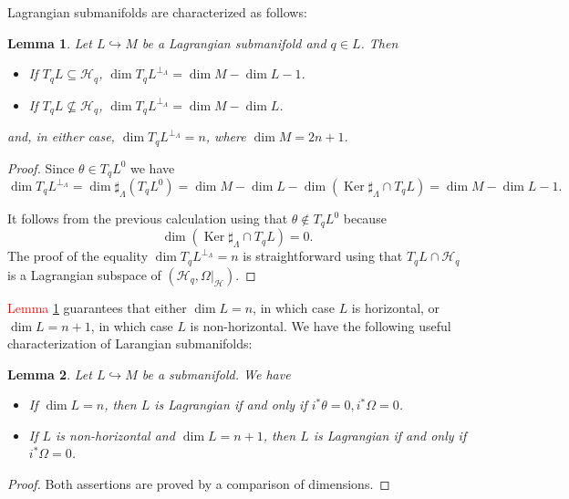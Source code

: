 \documentclass[12pt]{article}
\newtheorem{lemma}{Lemma}[section]
\renewcommand{\dim}{\operatorname{dim}}
\renewcommand{\ker}{\operatorname{Ker}}
\begin{document}
Lagrangian submanifolds are characterized as follows:\\
\begin{lemma}\label{PropertiesLagrangianCosympelctic}Let $L\hookrightarrow M$ be a Lagrangian submanifold and $q \in L$. Then
\begin{itemize}
\item[i)] If $T_qL \subseteq \mathcal{H}_q$, $\dim T_qL^{\perp_\Lambda} = \dim M - \dim L -1$.
\item[ii)] If $T_qL \not \subseteq \mathcal{H}_q$, $\dim T_qL^{\perp_\Lambda} = \dim M - \dim L$.
\end{itemize}
and, in either case, $\dim T_qL^{\perp_\Lambda} = n$, where $\dim M = 2n +1$.
\end{lemma}
\begin{proof}\item[$i)$] Since $\theta \in T_qL^0$ we have $$\dim T_qL^{\perp_ \Lambda} = \dim \sharp_\Lambda(T_qL^0) = \dim M - \dim L - \dim (\ker \sharp_\Lambda \cap T_qL) = \dim M - \dim L - 1.$$
\item[$ii)$] It follows from the previous calculation using that $\theta \not \in T_qL^0$ because $$\dim(\ker\sharp_\Lambda \cap T_qL) = 0.$$
The proof of the equality $\dim T_qL^{\perp_\Lambda} = n$ is straightforward using that $T_qL \cap \mathcal{H}_q$ is a Lagrangian subspace of $(\mathcal{H}_q, \Omega|_\mathcal{H})$.
\end{proof}

\textcolor{red}{Lemma \ref{PropertiesLagrangianCosympelctic}} guarantees that either $\dim L = n$, in which case $L$ is horizontal, or $\dim L = n+1$, in which case $L$ is non-horizontal. We have the following useful characterization of Larangian submanifolds:\\
\begin{lemma} \label{CharacterizationLagrangianCosymplectic}Let $L \hookrightarrow M$ be a submanifold. We have
\begin{itemize}
\item[i)] If $\dim L = n$, then $L$ is Lagrangian if and only if $i^* \theta = 0, i^* \Omega = 0$.
\item[ii)] If $L$ is non-horizontal and $\dim L = n+1$, then $L$ is Lagrangian if and only if $i^*\Omega = 0$.
\end{itemize}
\end{lemma}
\begin{proof} Both assertions are proved by a comparison of dimensions.
\end{proof}
\end{document}

